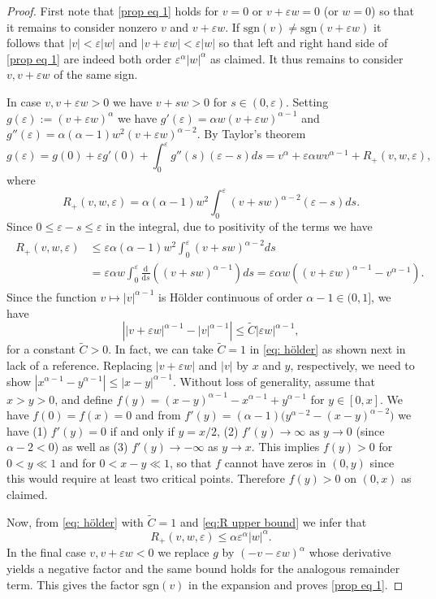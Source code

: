 \documentclass{article}
\numberwithin{equation}{section}
\def\eps{\varepsilon}
\def\rmd{\mathrm{d}}
\begin{document}
\begin{proof}
First note that \eqref{prop eq 1} holds for $v=0$ or $v+ \eps w=0$ (or $w=0$) so that it remains to consider nonzero $v$ and $v+\eps w$. If $\mathrm{sgn}(v)\neq \mathrm{sgn}(v+\eps w)$ it follows that  $|v|<\eps |w|$ and $|v+\eps w|<\eps |w|$  so that left and right hand side of \eqref{prop eq 1} are indeed both order $\eps^\alpha |w|^\alpha$ as claimed. It thus remains to consider $v,v+\eps w$ of the same sign. 

In case $v,v+\eps w>0$ we have $v+s w>0$ for $s\in(0,\eps)$. Setting $g(\eps):=(v+\eps w)^\alpha$ we have $g'(\eps)=\alpha w (v+\eps w)^{\alpha-1}$ and $g''(\eps) = \alpha(\alpha-1) w^2(v+\eps w)^{\alpha-2}$. 
		By Taylor's theorem
		\[
		g(\eps) = g(0) + \eps g'(0) + \int_0^\eps g''(s) (\eps-s) ds
		= v^\alpha + \eps \alpha w v^{\alpha-1} + R_+(v,w,\eps), 
		\]
		where 
		\[
		R_+(v,w,\eps) = \alpha(\alpha-1)w^2 \int_0^\eps (v+sw)^{\alpha-2}(\eps-s) ds.
		\]
		Since $0\leq \eps-s \leq \eps$ in the integral, due to positivity of the terms we have
		\begin{align}\label{eq:R upper bound}
			\begin{split}
				R_+(v,w,\eps) &\leq \eps \alpha (\alpha-1)w^2 \int_0^\eps (v+sw)^{\alpha-2} ds\\
				&= \eps \alpha w \int_0^\eps \frac{\rmd}{\rmd s}\left((v+sw)^{\alpha-1}\right) ds = \eps \alpha w \left((v+\eps w)^{\alpha-1} - v^{\alpha-1}\right).
			\end{split}
		\end{align}
Since the function \(v \mapsto |v|^{\alpha-1}\) is H\"older continuous of order \(\alpha-1 \in (0,1]\), we have 
\begin{equation}\label{eq: hölder}
\left||v+\eps w|^{\alpha-1} - |v|^{\alpha-1}\right| \leq \tilde C |\varepsilon w|^{\alpha-1},
\end{equation}
for a constant $\tilde C>0$. In fact, we can take $\tilde C=1$ in \eqref{eq: hölder} as shown next in lack of a reference. Replacing $|v+\eps w|$ and $|v|$ by $x$ and $y$, respectively, we need to show $|x^{\alpha-1} - y^{\alpha-1}| \leq |x-y|^{\alpha-1}$. Without loss of generality, assume that $x > y >0$, and define $f(y) = (x-y)^{\alpha-1} - x^{\alpha-1} + y^{\alpha-1}$ for $y \in [0,x]$. We have  $f(0) = f(x) =0$ and from $f'(y) = (\alpha-1)\big(y^{\alpha-2} - (x-y)^{\alpha-2}\big)$ we have (1) $f'(y) =0$ if and only if $y=x/2$, (2) $f'(y) \rightarrow \infty \text{ as } y \rightarrow 0$ (since $\alpha-2<0$) as well as (3) $f'(y) \rightarrow - \infty$ as $y \rightarrow x$. This implies $f(y)>0$ for $0<y \ll 1$ and for $0 < x-y \ll 1$, so that $f$ cannot have zeros in $(0,y)$ since this would require at least two critical points. Therefore $f(y) > 0$ on $(0,x)$ as claimed. 


Now, from \eqref{eq: hölder} with $\tilde C=1$ and \eqref {eq:R upper bound} we infer that
\[
R_+(v,w,\eps)  \leq \alpha\eps^\alpha |w|^{\alpha}.
\]	
In the final case $v, v+\eps w<0$ we replace $g$ by $(-v-\eps w)^\alpha$ whose derivative yields a negative factor and the same bound holds for the analogous remainder term. This gives the factor $\mathrm{sgn}(v)$ in the expansion and proves \eqref{prop eq 1}. 
\end{proof}
		
\end{document}
